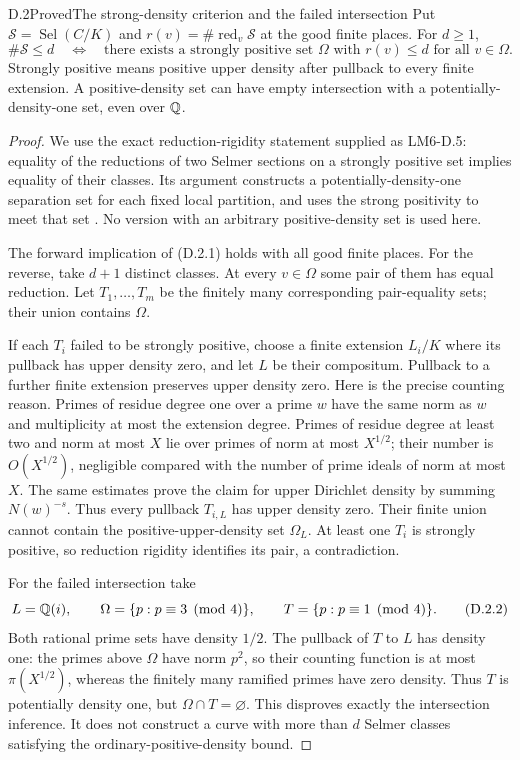 \begin{statement}{D.2}{Proved}{The strong-density criterion and the failed intersection}
Put $\mathcal S=\operatorname{Sel}(C/K)$ and
$r(v)=\#\operatorname{red}_v\mathcal S$ at the good finite places.
For $d\geq1$,
\[
 \#\mathcal S\leq d
 \quad\Longleftrightarrow\quad
 \text{there exists a strongly positive set $\Omega$ with
 $r(v)\leq d$ for all $v\in\Omega$}.
 \tag{D.2.1}
\]
Strongly positive means positive upper density after pullback to
every finite extension. A positive-density set can have empty
intersection with a potentially-density-one set, even over $\mathbb Q$.
\end{statement}
\begin{proof}
We use the exact reduction-rigidity statement supplied as
LM6-D.5: equality of the reductions of two Selmer sections on a
strongly positive set implies equality of their classes. Its
argument constructs a potentially-density-one separation set for
each fixed local partition, and uses the strong positivity to
meet that set \cite[D.5]{AgentLM6}. No version with an arbitrary
positive-density set is used here.

The forward implication of (D.2.1) holds with all good finite
places. For the reverse, take $d+1$ distinct classes. At every
$v\in\Omega$ some pair of them has equal reduction. Let
$T_1,\ldots,T_m$ be the finitely many corresponding pair-equality
sets; their union contains $\Omega$.

If each $T_i$ failed to be strongly positive, choose a finite
extension $L_i/K$ where its pullback has upper density zero, and
let $L$ be their compositum. Pullback to a further finite
extension preserves upper density zero. Here is the precise
counting reason. Primes of residue degree one over a prime $w$
have the same norm as $w$ and multiplicity at most the extension
degree. Primes of residue degree at least two and norm at most
$X$ lie over primes of norm at most $X^{1/2}$; their number is
$O(X^{1/2})$, negligible compared with the number of prime
ideals of norm at most $X$. The same estimates prove the claim
for upper Dirichlet density by summing $N(w)^{-s}$.
Thus every pullback $T_{i,L}$ has upper density zero. Their
finite union cannot contain the positive-upper-density set
$\Omega_L$. At least one $T_i$ is strongly positive, so reduction
rigidity identifies its pair, a contradiction.

For the failed intersection take
\[
 L=\mathbb Q(i),\qquad
 \Omega=\{p:p\equiv3\pmod4\},\qquad
 T=\{p:p\equiv1\pmod4\}.
 \tag{D.2.2}
\]
Both rational prime sets have density $1/2$. The pullback of
$T$ to $L$ has density one: the primes above $\Omega$ have norm
$p^2$, so their counting function is at most
$\pi(X^{1/2})$, whereas the finitely many ramified primes have
zero density. Thus $T$ is potentially density one, but
$\Omega\cap T=\varnothing$. This disproves exactly the
intersection inference. It does not construct a curve with more
than $d$ Selmer classes satisfying the ordinary-positive-density
bound.
\end{proof}

